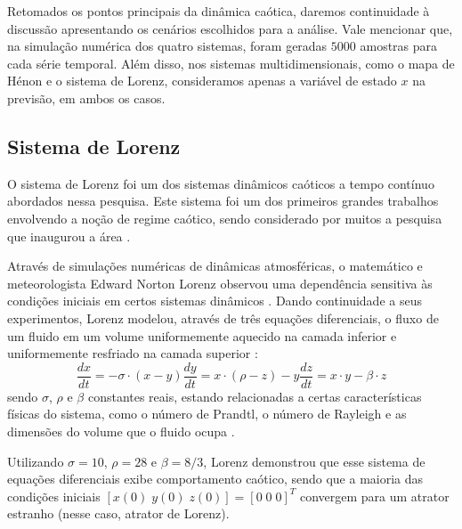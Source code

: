\documentclass[a4paper, 12pt]{article}
\begin{document}
Retomados os pontos principais da dinâmica caótica, daremos continuidade à discussão apresentando os cenários escolhidos para a análise. Vale mencionar que, na simulação numérica dos quatro sistemas, foram geradas $5000$ amostras para cada série temporal. Além disso, nos sistemas multidimensionais, como o mapa de Hénon e o sistema de Lorenz, consideramos apenas a variável de estado $x$ na previsão, em ambos os casos.

\subsection{Sistema de Lorenz}

O sistema de Lorenz foi um dos sistemas dinâmicos caóticos a tempo contínuo abordados nessa pesquisa. Este sistema foi um dos primeiros grandes trabalhos envolvendo a noção de regime caótico, sendo considerado por muitos a pesquisa que inaugurou a área \cite{gleick1998chaos}. 

Através de simulações numéricas de dinâmicas atmosféricas, o matemático e meteorologista Edward Norton Lorenz observou uma dependência sensitiva às condições iniciais em certos sistemas dinâmicos \cite{fiedler1994caos}. Dando continuidade a seus experimentos, Lorenz modelou, através de três equações diferenciais, o fluxo de um fluido em um volume uniformemente aquecido na camada inferior e uniformemente resfriado na camada superior \cite{lorenz1963deterministic}:
\begin{subequations}
\begin{equation}
\frac{dx}{dt} = -\sigma \cdot (x - y)
\end{equation}
\begin{equation}
\frac{dy}{dt} = x \cdot (\rho - z) - y
\end{equation}
\begin{equation}
\frac{dz}{dt} = x \cdot y - \beta \cdot z
\end{equation}
\end{subequations}
sendo $\sigma$, $\rho$ e $\beta$ constantes reais, estando relacionadas a certas características físicas do sistema, como o número de Prandtl, o número de Rayleigh e as dimensões do volume que o fluido ocupa \cite{fiedler1994caos}.

Utilizando $\sigma = 10$, $\rho = 28$ e $\beta = 8/3$, Lorenz demonstrou que esse sistema de equações diferenciais exibe comportamento caótico, sendo que a maioria das condições iniciais $[x(0)\; y(0)\; z(0)] = [0\; 0\; 0]^T$ convergem para um atrator estranho (nesse caso, atrator de Lorenz).
\end{document}
